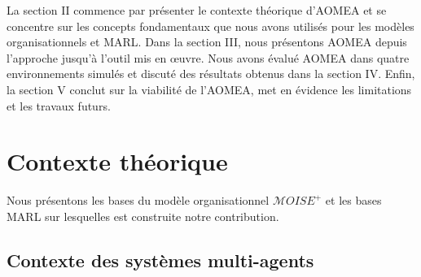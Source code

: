 \documentclass[contribution]{jfsma}
\begin{document}


La section II commence par présenter le contexte théorique d'AOMEA et se concentre sur les concepts fondamentaux que nous avons utilisés pour les modèles organisationnels et MARL.
Dans la section III, nous présentons AOMEA depuis l’approche jusqu’à l’outil mis en œuvre. Nous avons évalué AOMEA dans quatre environnements simulés et discuté des résultats obtenus dans la section IV. Enfin, la section V conclut sur la viabilité de l'AOMEA, met en évidence les limitations et les travaux futurs.


\section{Contexte théorique}





Nous présentons les bases du modèle organisationnel $\mathcal{M}OISE^+$ et les bases MARL sur lesquelles est construite notre contribution.

\subsection{Contexte des systèmes multi-agents}
\end{document}
